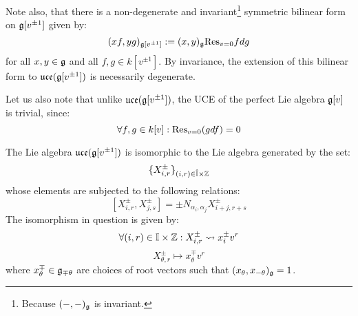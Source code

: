 \begin{example}
            Note also, that there is a non-degenerate and invariant\footnote{Because $(-, -)_{\mathfrak{g}}$ is invariant.} symmetric bilinear form on $\mathfrak{g}[v^{\pm 1}]$ given by:
                $$(xf, yg)_{\mathfrak{g}[v^{\pm 1}]} := (x, y)_{\mathfrak{g}} \mathrm{Res}_{v = 0} f dg$$
            for all $x, y \in \mathfrak{g}$ and all $f, g \in k[v^{\pm 1}]$. By invariance, the extension of this bilinear form to $\mathfrak{uce}(\mathfrak{g}[v^{\pm 1}])$ is necessarily degenerate.

            Let us also note that unlike $\mathfrak{uce}(\mathfrak{g}[v^{\pm 1}])$, the UCE of the perfect Lie algebra $\mathfrak{g}[v]$ is trivial, since:
                $$\forall f, g \in k[v]: \mathrm{Res}_{v = 0}(g df) = 0$$
        \end{example}

        \begin{lemma} \label{lemma: root_grading_for_affine_lie_algebras}
            The Lie algebra $\mathfrak{uce}(\mathfrak{g}[v^{\pm 1}])$ is isomorphic to the Lie algebra generated by the set:
                $$\{ X_{i, r}^{\pm} \}_{(i, r) \in \hat{\simpleroots} \x \Z}$$
            whose elements are subjected to the following relations:
                $$[X_{i, r}^{\pm}, X_{j, s}^{\pm}] = \pm N_{\alpha_i, \alpha_j} X_{i + j, r + s}^{\pm}$$
            The isomorphism in question is given by:
                $$\forall (i, r) \in \simpleroots \x \Z: X_{i, r}^{\pm} \mapsto x_i^{\pm} v^r$$
                $$X_{\theta, r}^{\pm} \mapsto x_{\theta}^{\mp} v^r$$
            where $x_{\theta}^{\mp} \in \mathfrak{g}_{\mp \theta}$ are choices of root vectors such that $(x_{\theta}, x_{-\theta})_{\mathfrak{g}} = 1$.
        \end{lemma}

